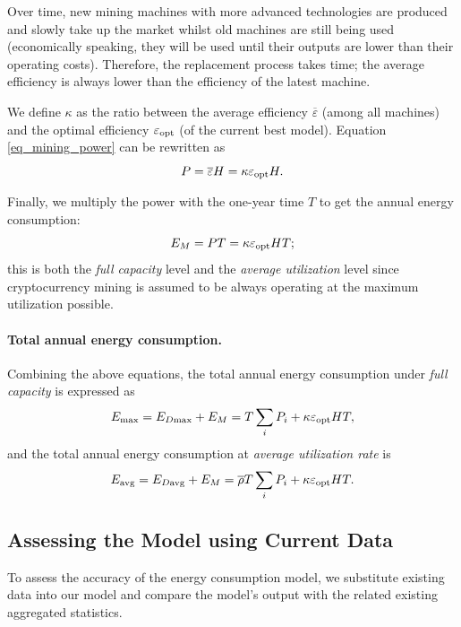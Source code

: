 \documentclass[12pt]{article}
\begin{document}
Over time, new mining machines with more advanced technologies are produced and slowly take up the market whilst old machines are still being used (economically speaking, they will be used until their outputs are lower than their operating costs). Therefore, the replacement process takes time; the average efficiency is always lower than the efficiency of the latest machine.

We define $\kappa$ as the ratio between the average efficiency $\overline{\varepsilon}$ (among all machines) and the optimal efficiency $\varepsilon_{\rm opt}$ (of the current best model). Equation \ref{eq_mining_power} can be rewritten as
\begin{equation}
	P = \overline{\varepsilon} H = \kappa \varepsilon_{\rm opt} H.
\end{equation}

Finally, we multiply the power with the one-year time $T$ to get the annual energy consumption:
\begin{equation}
	E_M = PT = \kappa \varepsilon_{\rm opt} HT;
\end{equation}
this is both the \textit{full capacity} level and the \textit{average utilization} level since cryptocurrency mining is assumed to be always operating at the maximum utilization possible.

\paragraph{Total annual energy consumption.} Combining the above equations, the total annual energy consumption under \textit{full capacity} is expressed as
\begin{equation}
	E_{\rm max} = E_{D \rm max} + E_M = T \sum_i P_i + \kappa \varepsilon_{\rm opt} HT,
\end{equation}
and the total annual energy consumption at \textit{average utilization rate} is
\begin{equation}
	E_{\rm avg} = E_{D \rm avg} + E_M = \overline{\rho} T \sum_i P_i + \kappa \varepsilon_{\rm opt} HT.
\end{equation}

\subsection{Assessing the Model using Current Data}

To assess the accuracy of the energy consumption model, we substitute existing data into our model and compare the model's output with the related existing aggregated statistics.
\end{document}
